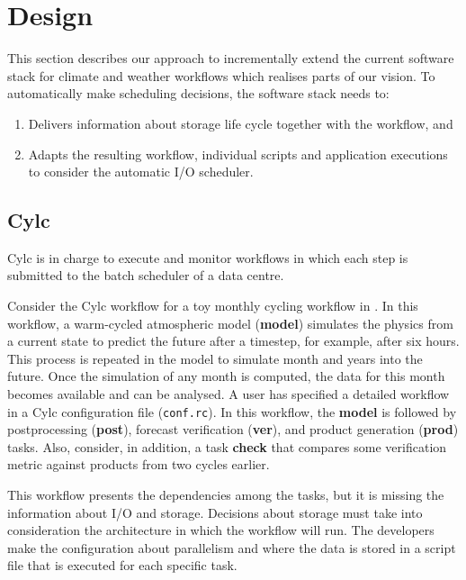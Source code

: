\documentclass{superfri}
\begin{document}
\section{Design}

This section describes our approach to incrementally extend the current software stack for climate and weather workflows which realises parts of our vision.
To automatically make scheduling decisions, the software stack needs to:

\begin{enumerate}

\item Delivers information about storage life cycle together with the workflow, and

\item Adapts the resulting workflow, individual scripts and application executions to consider the automatic I/O scheduler.

\end{enumerate}

\subsection{Cylc}

Cylc is in charge to execute and monitor workflows in which each step is submitted to the batch scheduler of a data centre.

Consider the Cylc workflow for a toy monthly cycling workflow in  \cite{8675433}.
In this workflow, a warm-cycled atmospheric model (\textbf{model}) simulates the physics from a current state to predict the future after a timestep, for example, after six hours.
This process is repeated in the model to simulate month and years into the future.
Once the simulation of any month is computed, the data for this month becomes available and can be analysed.
A user has specified a detailed workflow in a Cylc configuration file (\texttt{conf.rc}).
In this workflow, the \textbf{model} is followed by postprocessing (\textbf{post}), forecast verification (\textbf{ver}), and product generation (\textbf{prod}) tasks.
Also, consider, in addition, a task \textbf{check} that compares some verification metric against products from two cycles earlier.


This workflow presents the dependencies among the tasks, but it is missing the information about I/O and storage.
Decisions about storage must take into consideration the architecture in which the workflow will run.
The developers make the configuration about parallelism and where the data is stored in a script file that is executed for each specific task.
\end{document}
